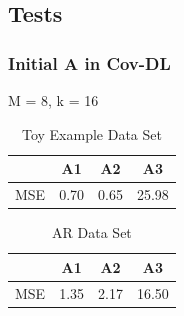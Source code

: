 \subsection{Tests}

\subsubsection{Initial A in Cov-DL}

M = 8, k = 16

\begin{table}[H]
\centering
\begin{tabular}{|c|c|c|c|}
\hline 
 & A1 & A2 & A3 \\ 
\hline 
MSE & 0.70 & 0.65 & 25.98 \\ 
\hline 
\end{tabular} 
\caption{Toy Example Data Set}
\end{table}


\begin{table}[H]
\centering
\begin{tabular}{|c|c|c|c|}
\hline 
 & A1 & A2 & A3 \\ 
\hline 
MSE & 1.35 & 2.17 & 16.50 \\ 
\hline 
\end{tabular} 
\caption{AR Data Set}
\end{table}